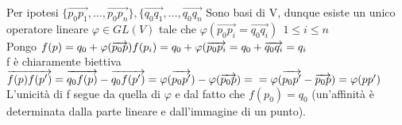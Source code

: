 \documentclass[12px]{article}
\begin{document}
	\begin{dimo}
		Per ipotesi $\{\overrightarrow{p_0p_1},\ldots,\overrightarrow{p_0p_n}\},\{\overrightarrow{q_0q_1}, \ldots, \overrightarrow{q_0q_n}$ Sono basi di V, dunque esiste un unico operatore lineare $\varphi\in GL(V)$ tale che $\varphi(\overrightarrow{p_0p_i} = \overrightarrow{q_0q_i}) \ \ 1\leq i\leq n$ \\
			Pongo	$f(p) = q_0 + \varphi(\overrightarrow{p_0p})\\
			f(p_i) = q_0 + \varphi(\overrightarrow{p_0p_i} = q_0 + \overrightarrow{q_0q_i} = q_i$ \\ 
			f è chiaramente biettiva
			$\overrightarrow{f(p)f(p')} = \overrightarrow{q_0f(p)} - \overrightarrow{q_0f(p')} = \varphi(\overrightarrow{p_0p'}) - \varphi(\overrightarrow{p_0p}) = \\= \varphi(\overrightarrow{p_0p'} - \overrightarrow{p_0p}) = \varphi(pp')$ \\
			L'unicità di f segue da quella di $\varphi$ e dal fatto che $f(p_0) = q_0$ (un'affinità è determinata dalla parte lineare e dall'immagine di un punto).
	\end{dimo}
	\newpage
\end{document}
